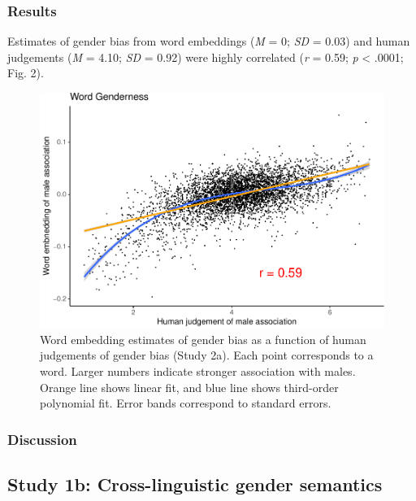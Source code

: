 \documentclass[man]{apa6}
\theoremstyle{definition}
\theoremstyle{definition}
\theoremstyle{definition}
\theoremstyle{remark}
\begin{document}
\subsubsection{Results}\label{results-1}

Estimates of gender bias from word embeddings (\emph{M} = 0; \emph{SD} =
0.03) and human judgements (\emph{M} = 4.10; \emph{SD} = 0.92) were
highly correlated (\emph{r} = 0.59; \emph{p} \textless{} .0001; Fig. 2).

\begin{figure}[t]

{\centering \includegraphics{iat_lang_files/figure-latex/unnamed-chunk-9-1} 

}

\caption{Word embedding estimates of gender bias as a function of human judgements of gender bias (Study 2a).  Each point corresponds to a word. Larger numbers indicate stronger association with males. Orange line shows linear fit, and blue line shows third-order polynomial fit. Error bands correspond to standard errors. }\label{fig:unnamed-chunk-9}
\end{figure}

\subsubsection{Discussion}\label{discussion-1}

\subsection{Study 1b: Cross-linguistic gender
semantics}\label{study-1b-cross-linguistic-gender-semantics}
\end{document}
